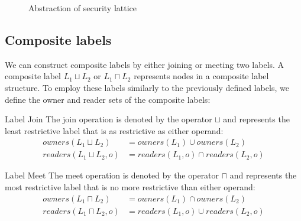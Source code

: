 \begin{figure}
  \begin{center}
  \caption{Abstraction of security lattice}
  \label{dlm:lattice_fig}
  \end{center}
\end{figure}

\subsection{Composite labels}
We can construct composite labels by either joining or meeting two labels.
A composite label $L_1 \sqcup L_2$ or $L_1 \sqcap L_2$ represents nodes in a composite label structure.
To employ these labels similarly to the previously defined labels, we define the owner and reader sets of the composite labels:

\begin{definition}{Label Join}\label{dlm:def:join}
The join operation is denoted by the operator $\sqcup$ and represents the least restrictive label that is as restrictive as either operand:
  \begin{align*}
    owners(L_1 \sqcup L_2) &= owners(L_1) \cup owners(L_2) \\
    readers(L_1 \sqcup L_2, o) &= readers(L_1, o) \cap readers(L_2, o)
  \end{align*}
\end{definition}
\begin{definition}{Label Meet}\label{dlm:def:meet}
The meet operation is denoted by the operator $\sqcap$ and represents the most restrictive label that is no more restrictive than either operand:
  \begin{align*}
    owners(L_1 \sqcap L_2) &= owners(L_1) \cap owners(L_2) \\
    readers(L_1 \sqcap L_2, o) &= readers(L_1, o) \cup readers(L_2, o)
  \end{align*}
\end{definition}

